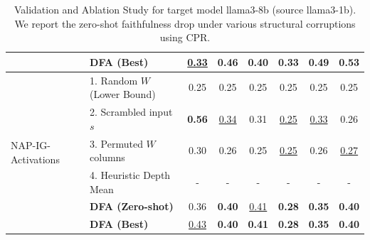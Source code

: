 \documentclass{article} %
\begin{document}
\begin{table}[!t]
{\begin{tabular}{llcccccc}
& \textbf{DFA (Best)} & \underline{0.33} & \textbf{0.46} & \textbf{0.40} & \textbf{0.33} & \textbf{0.49} & \textbf{0.53} \\
\midrule
\multirow{6}{*}{NAP-IG-Activations} & 1. Random $W$ (Lower Bound) & 0.25 & 0.25 & 0.25 & 0.25 & 0.25 & 0.25 \\
& 2. Scrambled input $s$ & \textbf{0.56} & \underline{0.34} & 0.31 & \underline{0.25} & \underline{0.33} & 0.26 \\
& 3. Permuted $W$ columns & 0.30 & 0.26 & 0.25 & \underline{0.25} & 0.26 & \underline{0.27} \\
& 4. Heuristic Depth Mean & - & - & - & - & - & - \\
\addlinespace[4pt]
& \textbf{DFA (Zero-shot)} & 0.36 & \textbf{0.40} & \underline{0.41} & \textbf{0.28} & \textbf{0.35} & \textbf{0.40} \\
& \textbf{DFA (Best)} & \underline{0.43} & \textbf{0.40} & \textbf{0.41} & \textbf{0.28} & \textbf{0.35} & \textbf{0.40} \\
\bottomrule
\end{tabular}
}
\caption{Validation and Ablation Study for target model llama3-8b (source llama3-1b). We report the zero-shot faithfulness drop under various structural corruptions using CPR.}
\label{tab:ablations-summary-llama3-1b-to-llama3-8b}
\end{table}
\end{document}
